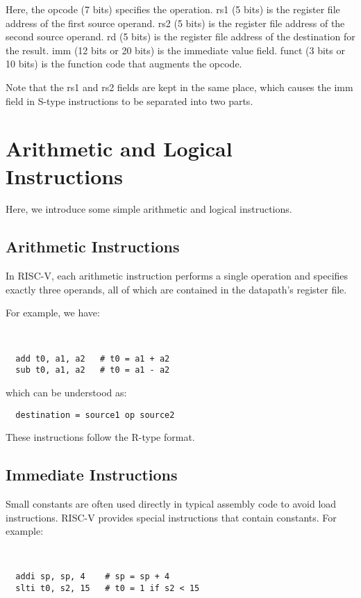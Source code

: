 Here, the opcode (7 bits) specifies the operation. rs1 (5 bits) is the register file address of the first source operand. rs2 (5 bits) is the register file address of the second source operand. rd (5 bits) is the register file address of the destination for the result. imm (12 bits or 20 bits) is the immediate value field. funct (3 bits or 10 bits) is the function code that augments the opcode.

Note that the rs1 and rs2 fields are kept in the same place, which causes the imm field in S-type instructions to be separated into two parts.

\section{Arithmetic and Logical Instructions}
Here, we introduce some simple arithmetic and logical instructions.

\subsection{Arithmetic Instructions}
In RISC-V, each arithmetic instruction performs a single operation and specifies exactly three operands, all of which are contained in the datapath's register file.

For example, we have:
\begin{codeBlock}~
\begin{verbatim}
  add t0, a1, a2   # t0 = a1 + a2
  sub t0, a1, a2   # t0 = a1 - a2
\end{verbatim}
\end{codeBlock}

which can be understood as:
\begin{verbatim}
  destination = source1 op source2
\end{verbatim}

These instructions follow the R-type format.

\subsection{Immediate Instructions}
Small constants are often used directly in typical assembly code to avoid load instructions. RISC-V provides special instructions that contain constants. For example:
\begin{codeBlock}~
\begin{verbatim}
  addi sp, sp, 4    # sp = sp + 4
  slti t0, s2, 15   # t0 = 1 if s2 < 15
\end{verbatim}
\end{codeBlock}

